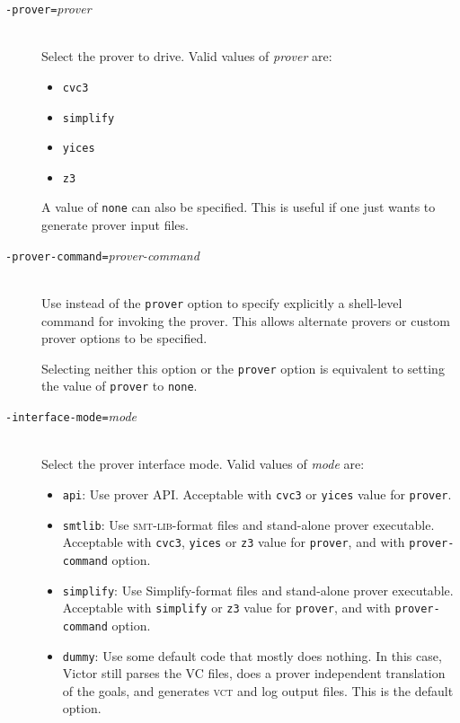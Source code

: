 \documentclass[12pt,fleqn]{article}
\newcommand{\smtlib}{\textsc{smt-lib}}
\newcommand{\csv}{\textsc{vct}}
\newcommand{\optionv}[2]{\item[\texttt{-{#1}=}\mdseries\textit{#2}]\ \\}
\begin{document}
\begin{description}
\optionv{prover}{prover}
  Select the prover to drive.  Valid values of \emph{prover} are:
  \begin{itemize}
  \item \texttt{cvc3}
  \item \texttt{simplify}
  \item \texttt{yices}
  \item \texttt{z3}
  \end{itemize}
  A value of \texttt{none} can also be specified.  This is useful if
  one just wants to generate prover input files.

\optionv{prover-command}{prover-command}
  Use instead of the \texttt{prover} option to specify explicitly a
  shell-level command for invoking the prover.  This allows alternate
  provers or custom prover options to be specified.

  Selecting neither this option or the \texttt{prover} option is
  equivalent to setting the value of \texttt{prover} to \texttt{none}.
  
\optionv{interface-mode}{mode}
  Select the prover interface mode.  Valid values of \emph{mode} are:
  \begin{itemize}
  \item \texttt{api}: Use prover API.  
    Acceptable with \texttt{cvc3} or \texttt{yices}
    value for \texttt{prover}.

  \item \texttt{smtlib}: Use \smtlib{}-format files and
     stand-alone prover executable.
    Acceptable with \texttt{cvc3}, \texttt{yices} or \texttt{z3}
    value for \texttt{prover},
    and with \texttt{prover-command} option.

  \item \texttt{simplify}: Use Simplify-format files and
     stand-alone prover executable. 
    Acceptable with \texttt{simplify} or \texttt{z3} value for
    \texttt{prover}, 
    and with \texttt{prover-command} option.

  \item \texttt{dummy}: 
    Use some default code that mostly does nothing.  In this case,
    Victor still parses the VC files, does a prover independent
    translation of the goals, and generates \csv{} and log output
    files.  This is the default option. 
  \end{itemize}

\end{description}
\end{document}
